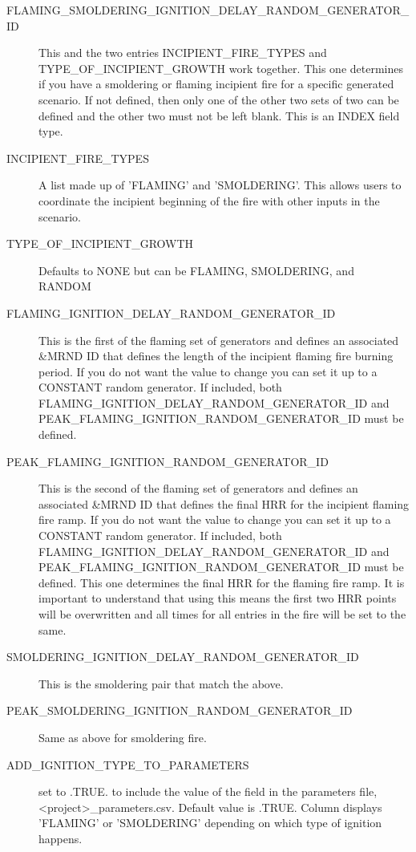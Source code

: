 \documentclass[12pt,twoside]{book}
\begin{document}
 \begin{description}
  \item[FLAMING\_SMOLDERING\_IGNITION\_DELAY\_RANDOM\_GENERATOR\_ID] This and the two entries {\ct INCIPIENT\_FIRE\_TYPES} and {\ct TYPE\_OF\_INCIPIENT\_GROWTH} work together. This one determines if you have a smoldering or flaming incipient fire for a specific generated scenario. If  not defined, then only one of the other two sets of two can be defined and the other two must not be left blank. This is an {\ct INDEX} field type.
  \item[INCIPIENT\_FIRE\_TYPES] A list made up of 'FLAMING' and 'SMOLDERING'. This allows users to coordinate the incipient beginning of the fire with other inputs in the scenario.
  \item[TYPE\_OF\_INCIPIENT\_GROWTH] Defaults to {\ct NONE} but can be {\ct FLAMING}, {\ct SMOLDERING}, and {\ct RANDOM}
  \item[FLAMING\_IGNITION\_DELAY\_RANDOM\_GENERATOR\_ID] This is the first of the flaming set of generators and defines an associated {\ct \&MRND} ID that defines the length of the incipient flaming fire burning period. If you do not want the value to change you can set it up to a {\ct CONSTANT} random generator. If included, both {\ct FLAMING\_IGNITION\_DELAY\_RANDOM\_GENERATOR\_ID} and {\ct PEAK\_FLAMING\_IGNITION\_RANDOM\_GENERATOR\_ID} must be defined.
  \item[PEAK\_FLAMING\_IGNITION\_RANDOM\_GENERATOR\_ID] This is the second of the flaming set of generators and defines an associated {\ct \&MRND} ID that defines the final HRR for the incipient flaming fire ramp. If you do not want the value to change you can set it up to a {\ct CONSTANT} random generator. If included, both {\ct FLAMING\_IGNITION\_DELAY\_RANDOM\_GENERATOR\_ID} and {\ct PEAK\_FLAMING\_IGNITION\_RANDOM\_GENERATOR\_ID} must be defined. This one determines the final HRR for the flaming fire ramp. It is important to understand that using this means the first two HRR points will be overwritten and all times for all entries in the fire will be set to the same.
  \item[SMOLDERING\_IGNITION\_DELAY\_RANDOM\_GENERATOR\_ID] This is the smoldering pair that match the above.
  \item[PEAK\_SMOLDERING\_IGNITION\_RANDOM\_GENERATOR\_ID] Same as above for smoldering fire.
  \item[ADD\_IGNITION\_TYPE\_TO\_PARAMETERS] set to .TRUE. to include the value of the field in the parameters file, {\ct <project>\_parameters.csv}. Default value is .TRUE. Column displays 'FLAMING' or 'SMOLDERING' depending on which type of ignition happens.

\end{description}
\end{document}
